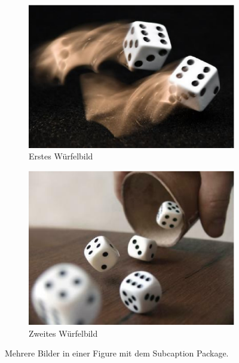\documentclass[12pt,a4paper]{scrartcl}
\begin{document}
\begin{figure}[h]
    \begin{subfigure}[h]{0.49\textwidth}
        \includegraphics[width=\textwidth]{figures/bildwuerfel1}
        \caption{Erstes Würfelbild}
        \label{fig:wuerfel1}
    \end{subfigure}
    \hfill
    \begin{subfigure}[h]{0.49\textwidth}
        \includegraphics[width=\textwidth]{figures/bildwuerfel2}
        \caption{Zweites Würfelbild}
        \label{fig:wuerfel2}
    \end{subfigure}
    \caption{Mehrere Bilder in einer Figure mit dem Subcaption Package.}
    \label{fig:wuerfels}
\end{figure}
\end{document}
